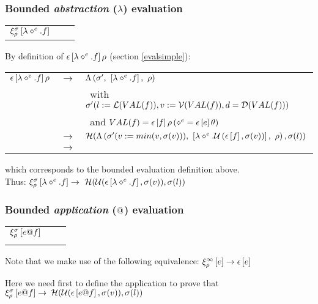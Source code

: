 \documentclass[10pt,a4paper,frenchb]{article}
\makeatletter
\newcommand{\evaltable}[1][$\rightarrow$]	  {\begin{center} \begin{tabular*}{\linewidth}{rc@{ #1 }l}}
\newcommand{\evaltablend}  		{\end{tabular*}\end{center}}
\newcommand{\ra}					{\ensuremath{\rightarrow}}
\makeatother
\begin{document}
\subsubsection{Bounded \emph{abstraction} ($\lambda$) evaluation}
\evaltable
 $\evalexpr{\lambdaexpr{e}{f}}$ 	& & \bevalLambda{e}{f}{\envsym}{\bounds} \\
\evaltablend

By definition of $\evalsimple{\lambdaexpr{e}{f}}$  (section \ref{evalsimple}):
\evaltable[]
 $\evalsimple{\lambdaexpr{e}{f}}$ 	& \ra & $\sevalLambda{e}{f}{\envsym}{\bounds'}$ \\
 				& & \ with $\bounds'(l:=\length(VAL(f)), v:=\voices(VAL(f)), d=\dur(VAL(f)))$ \\
			 	& & \ and $VAL(f) = \evalss{f}\envsym\left(\var{e}= \evalss{e}\emptyenv\right)$ \\
\equivalence{\sevalLambda{e}{f}{\envsym}{\bounds'}} 
	&  \ra & $\head( \topClosure{e}{f}{\bounds'}{\bounds(v)}, \bounds(l))$ \\
	&  \ra & \closure{e}{\headOp{\topOp{\evalss{f}}{\bounds(v)}}{\bounds(l)}}{\envsym}{\bounds'(l:=min(l,\bounds(l), v:=min(v, \bounds(v)}
\evaltablend

which corresponds to the bounded evaluation definition above. \\
Thus: \hspace{1cm} $\evalexpr{\lambdaexpr{e}{f}} \rightarrow \ \equivalence{\evalss{\lambdaexpr{e}{f}}}$


\subsubsection{Bounded \emph{application} ($\applyop$) evaluation}
\evaltable
 $\evalexpr{\opexpr{\applyop}}$ 	
 		&  & \bevalApply{e}{f} \\
 		&  & \bevalApply[\evalss]{e}{f} \\
\evaltablend
Note that we make use of the following equivalence: \hspace{15mm} $\evalexpr[\nobounds]{e} \rightarrow \evalss{e}$

Here we need first to define the application \boundapplysym{\bounds} to prove that \hspace{5mm} $\evalexpr{\opexpr{\applyop}} \rightarrow \: \equivalence{\evalss{\opexpr{\applyop}}}$ 
\end{document}

